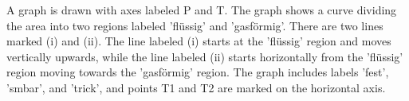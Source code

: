 A graph is drawn with axes labeled P and T. The graph shows a curve dividing the area into two regions labeled 'flüssig' and 'gasförmig'. There are two lines marked (i) and (ii). The line labeled (i) starts at the 'flüssig' region and moves vertically upwards, while the line labeled (ii) starts horizontally from the 'flüssig' region moving towards the 'gasförmig' region. The graph includes labels 'fest', 'smbar', and 'trick', and points T1 and T2 are marked on the horizontal axis.